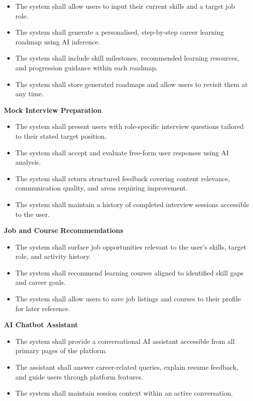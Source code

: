 \documentclass[12pt]{article}
\begin{document}
\begin{itemize}
  \item The system shall allow users to input their current skills and a target job role.
  \item The system shall generate a personalised, step-by-step career learning roadmap using AI inference.
  \item The system shall include skill milestones, recommended learning resources, and progression guidance within each roadmap.
  \item The system shall store generated roadmaps and allow users to revisit them at any time.
\end{itemize}

\textbf{Mock Interview Preparation}

\begin{itemize}
  \item The system shall present users with role-specific interview questions tailored to their stated target position.
  \item The system shall accept and evaluate free-form user responses using AI analysis.
  \item The system shall return structured feedback covering content relevance, communication quality, and areas requiring improvement.
  \item The system shall maintain a history of completed interview sessions accessible to the user.
\end{itemize}

\textbf{Job and Course Recommendations}

\begin{itemize}
  \item The system shall surface job opportunities relevant to the user's skills, target role, and activity history.
  \item The system shall recommend learning courses aligned to identified skill gaps and career goals.
  \item The system shall allow users to save job listings and courses to their profile for later reference.
\end{itemize}

\textbf{AI Chatbot Assistant}

\begin{itemize}
  \item The system shall provide a conversational AI assistant accessible from all primary pages of the platform.
  \item The assistant shall answer career-related queries, explain resume feedback, and guide users through platform features.
  \item The system shall maintain session context within an active conversation.
\end{itemize}
\end{document}
